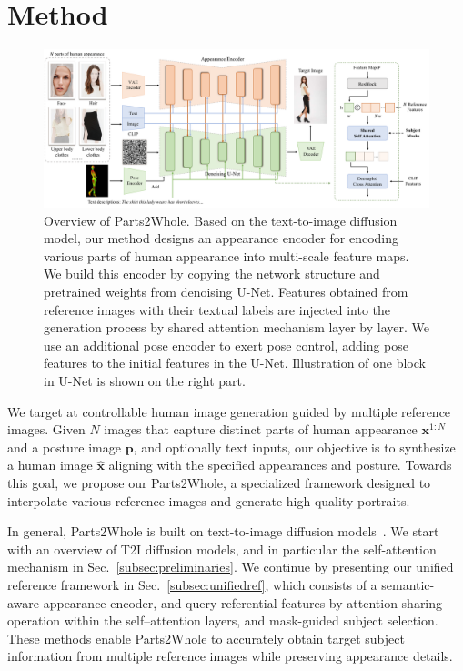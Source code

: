 \section{Method}

\begin{figure}
    \centering
    \includegraphics[width=\textwidth]{figure/overview.pdf}
    \caption{Overview of Parts2Whole. Based on the text-to-image diffusion model, our method designs an appearance encoder for encoding various parts of human appearance into multi-scale feature maps. We build this encoder by copying the network structure and pretrained weights from denoising U-Net. Features obtained from reference images with their textual labels are injected into the generation process by shared attention mechanism layer by layer.  We use an additional pose encoder to exert pose control, adding pose features to the initial features in the U-Net. Illustration of one block in U-Net is shown on the right part.}
    \label{fig:overview}
\end{figure}

We target at controllable human image generation guided by multiple reference images. Given $N$ images that capture distinct parts of human appearance $\bm{x}^{1:N}$ and a posture image $\bm{p}$, and optionally text inputs, our objective is to synthesize a human image $\hat{\bm{x}}$ aligning with the specified appearances and posture. Towards this goal, we propose our Parts2Whole, a specialized framework designed to interpolate various reference images and generate high-quality portraits.

In general, Parts2Whole is built on text-to-image diffusion models~\cite{rombach2022ldm}. We start with an overview of T2I diffusion models, and in particular the self-attention mechanism in Sec.~\ref{subsec:preliminaries}. We continue by presenting our unified reference framework in Sec.~\ref{subsec:unifiedref}, which consists of a semantic-aware appearance encoder, and query referential features by attention-sharing operation within the self–attention layers, and mask-guided subject selection. These methods enable Parts2Whole to accurately obtain target subject information from multiple reference images while preserving appearance details.

